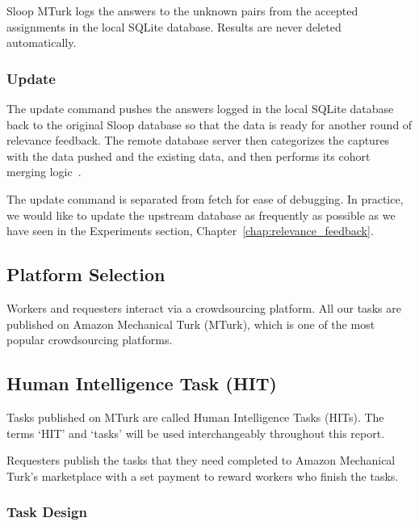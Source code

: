 Sloop MTurk logs the answers to the unknown pairs from the accepted assignments
in the local SQLite database. Results are never deleted automatically.

\subsubsection{Update}

The update command pushes the answers logged in the local SQLite database back
to the original Sloop database so that the data is ready for another round of
relevance feedback. The remote database server then categorizes the captures
with the data pushed and the existing data, and then performs its cohort
merging logic~\cite{sloopdocs}.

The update command is separated from fetch for ease of debugging. In
practice, we would like to update the upstream database as frequently as
possible as we have seen in the Experiments section,
Chapter~\ref{chap:relevance_feedback}.

\subsection{Platform Selection}

Workers and requesters interact via a crowdsourcing platform. All our tasks
are published on Amazon Mechanical Turk (MTurk), which is one of the most
popular crowdsourcing platforms.

\subsection{Human Intelligence Task (HIT)}

Tasks published on MTurk are called Human Intelligence Tasks (HITs). The terms
`HIT' and `tasks' will be used interchangeably throughout this report.

Requesters publish the tasks that they need completed to Amazon Mechanical
Turk's marketplace with a set payment to reward workers who finish the tasks.

\subsubsection{Task Design}

